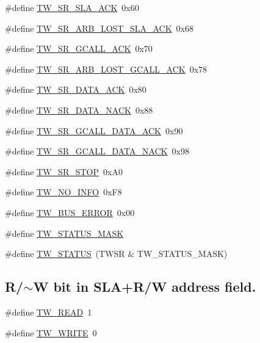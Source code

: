 \begin{DoxyCompactItemize}
\item 
\#define \hyperlink{group__util__twi_ga9e9e761d674793772e6b3f77fc9d7fab}{TW\_\-SR\_\-SLA\_\-ACK}~0x60
\item 
\#define \hyperlink{group__util__twi_ga1c3ed5ed345d17972002b9fd07f4f829}{TW\_\-SR\_\-ARB\_\-LOST\_\-SLA\_\-ACK}~0x68
\item 
\#define \hyperlink{group__util__twi_ga6eb3b4230887a8b73d7787ff231ea911}{TW\_\-SR\_\-GCALL\_\-ACK}~0x70
\item 
\#define \hyperlink{group__util__twi_ga4756103341a65e0e3889996cdf15b2fa}{TW\_\-SR\_\-ARB\_\-LOST\_\-GCALL\_\-ACK}~0x78
\item 
\#define \hyperlink{group__util__twi_gac50f1a59c74c3109d4913dbecfb472c1}{TW\_\-SR\_\-DATA\_\-ACK}~0x80
\item 
\#define \hyperlink{group__util__twi_ga6c0fa701fe9d96b0b7df29e8af154f94}{TW\_\-SR\_\-DATA\_\-NACK}~0x88
\item 
\#define \hyperlink{group__util__twi_ga4abaad098fd92bed63719ffb01802c8d}{TW\_\-SR\_\-GCALL\_\-DATA\_\-ACK}~0x90
\item 
\#define \hyperlink{group__util__twi_ga42234278f9b01b9af75dbbc617b97890}{TW\_\-SR\_\-GCALL\_\-DATA\_\-NACK}~0x98
\item 
\#define \hyperlink{group__util__twi_ga98d2570f965790884cf1774e716ec629}{TW\_\-SR\_\-STOP}~0xA0
\item 
\#define \hyperlink{group__util__twi_gabcff70642634cb53e9d8e93872f70c90}{TW\_\-NO\_\-INFO}~0xF8
\item 
\#define \hyperlink{group__util__twi_ga90d373160b1d0a3f0c454af83c57df71}{TW\_\-BUS\_\-ERROR}~0x00
\item 
\#define \hyperlink{group__util__twi_ga8d3aca0acc182f459a51797321728168}{TW\_\-STATUS\_\-MASK}
\item 
\#define \hyperlink{group__util__twi_ga4440385d1818b4fe89b20341ea47b75a}{TW\_\-STATUS}~(TWSR \& TW\_\-STATUS\_\-MASK)
\end{DoxyCompactItemize}
\subsection*{R/$\sim$W bit in SLA+R/W address field.}
\label{_amgrp8f939fc9c8471549ba6dd5932548fd46}
 \begin{DoxyCompactItemize}
\item 
\#define \hyperlink{group__util__twi_gaf40f13cadca25e0a83dc096858907819}{TW\_\-READ}~1
\item 
\#define \hyperlink{group__util__twi_gac8a7cb1a91946c6e3955608a91371148}{TW\_\-WRITE}~0
\end{DoxyCompactItemize}



